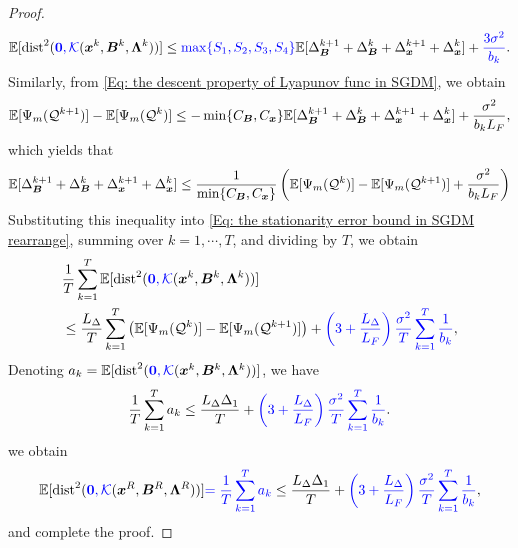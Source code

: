 \begin{proof}
    {\small
    \begin{align}\label{Eq: the stationarity error bound in SGDM rearrange}
        \mathbb{E}[\mathrm{dist}^{2}(\blue{\bm{0}, \mathcal K}(\bx^{k}, \bB^{k}, \bLmbd^{k}))] \leq \blue{\max\{S_{1}, S_{2}, S_{3}, S_{4}\}} \EE [\Delta_{\bB}^{k+1}+ \Delta_{\bB}^{k}+ \Delta_{\bx}^{k+1}+ \Delta_{\bx}^{k}] + \blue{\frac{3 \sigma^{2}}{b_{k}}}.\end{align}}
    Similarly, from \eqref{Eq: the descent property of Lyapunov func in SGDM}, we
    obtain
    \[
        \mathbb{E} [\Psi_m(\mathcal{Q}^{k+1})] - \mathbb{E}[\Psi_m(\mathcal{Q}^{k})]
        \leq -\min \{ C_{\bm{B}}, C_{\bm{x}}\}\mathbb{E}[\Delta_{\bm{B}}^{k+1}+ \Delta_{\bm{B}}^{k}+
        \Delta_{\bm{x}}^{k+1}+ \Delta_{\bm{x}}^{k}] + \frac{\sigma^{2}}{b_{k}L_{F}},
    \]
    which yields that
    \[
        \mathbb{E}[\Delta_{\bm{B}}^{k+1}+ \Delta_{\bm{B}}^{k}+ \Delta_{\bm{x}}^{k+1}+ \Delta_{\bm{x}}
        ^{k}] \leq \frac{1}{\min \{ C_{\bm{B}}, C_{\bm{x}}\}}\left( \mathbb{E} [\Psi_m(\mathcal{Q}
        ^{k})] - \mathbb{E}[\Psi_m(\mathcal{Q}^{k+1})] + \frac{\sigma^{2}}{b_{k}L_{F}}
        \right)
    \]
    Substituting this inequality into \eqref{Eq: the stationarity error bound in SGDM rearrange},
    summing over $k = 1, \cdots,T$, and dividing by $T$, we obtain
    \begin{align*}
        &\frac{1}{T}\sum\limits_{k=1}^{T} \mathbb{E}[\mathrm{dist}^{2}({\color{blue}\bm{0}, \mathcal K}(\bm{x}
        ^{k}, \bm{B}^{k}, \bm{\Lambda}^{k}))]\\
        &\leq \frac{L_{\Delta}}{T}\sum\limits_{k=1}^{T}
        \left(\mathbb{E} [\Psi_m(\mathcal{Q}^{k})] - \mathbb{E} [\Psi_m
        (\mathcal{Q}^{k+1})] \right) + {\color{blue}\left( 3 + \frac{L_{\Delta}}{L_F}\right) \frac{\sigma^{2}}{T}\sum\limits_{k=1}^{T}\frac{1}{b_{k}}},
    \end{align*} Denoting
    $a_{k}= \mathbb{E}[\mathrm{dist}^{2}({\color{blue}\bm{0}, \mathcal K}(\bm{x}^{k}, \bm{B}
    ^{k}, \bm{\Lambda}^{k}))]$, we have
    \[
        \frac{1}{T}\sum\limits_{k=1}^{T} a_{k}\leq \frac{L_{\Delta}\Delta_{1}}{T}+ {\color{blue}\left( 3 + \frac{L_{\Delta}}{L_F}
        \right) \frac{\sigma^{2}}{T}\sum\limits_{k=1}^{T}\frac{1}{b_{k}}}.
    \]
    we obtain
    \[
        \mathbb{E}[\mathrm{dist}^{2}({\color{blue}\bm{0}, \mathcal K}(\bm{x}^{R}, \bm{B}^{R}
        , \bm{\Lambda}^{R}))] {\color{blue}= \frac{1}{T}\sum\limits_{k=1}^{T}a_{k}} \leq \frac{L_{\Delta}\Delta_{1}}{T}+ {\color{blue}\left( 3 + \frac{L_{\Delta}}{L_F}
        \right) \frac{\sigma^{2}}{T}\sum\limits_{k=1}^{T}\frac{1}{b_{k}}},
    \] and complete the proof.
\end{proof}
